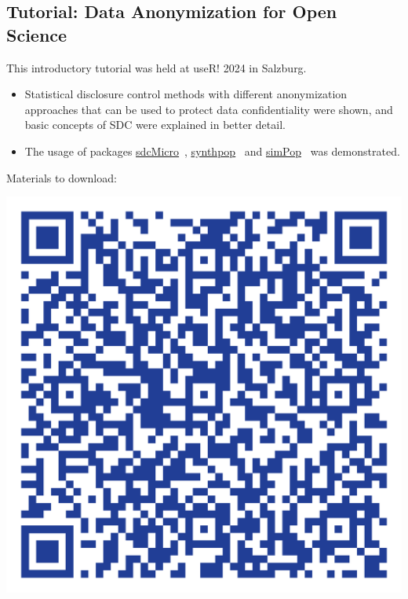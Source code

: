 \documentclass[a0,portrait]{a0poster}
\begin{document}
\begin{multicols}{3}
\section{Tutorial: Data Anonymization for Open Science}

This introductory tutorial was held at useR! 2024 in Salzburg. 

\begin{itemize}
    \item Statistical disclosure control methods with different anonymization approaches that can be used to protect data confidentiality were shown, and basic concepts of SDC were explained in better detail.
    \item The usage of packages \href{https://cran.r-project.org/web/packages/sdcMicro/index.html}{\color{blue}\underline{sdcMicro}}~\cite{2024_Sdcmicro}, \href{https://cran.r-project.org/web/packages/synthpop/index.html} {\color{blue}\underline{synthpop}}~\cite{2022_Synthpop} and \href{https://cran.r-project.org/web/packages/simPop/index.html}{\color{blue}\underline{simPop}}~\cite{2022_Simpop} was demonstrated.    
\end{itemize}

\vspace{1cm}
Materials to download: 

\includegraphics[width=0.4\linewidth]{Poster TEX/style/qr-code_useR.png}
\hspace{0.5cm} 


\end{multicols}
\end{document}
